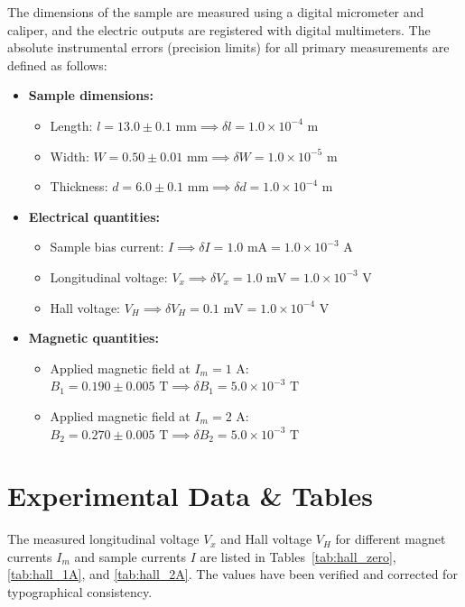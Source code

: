 \documentclass[a4paper,11pt]{article}
\begin{document}
The dimensions of the sample are measured using a digital micrometer and caliper, and the electric outputs are registered with digital multimeters. The absolute instrumental errors (precision limits) for all primary measurements are defined as follows:
\begin{itemize}
    \item {\bf Sample dimensions:}
    \begin{itemize}
        \item Length: $l = 13.0 \pm 0.1\text{ mm} \implies \delta l = 1.0 \times 10^{-4}\text{ m}$
        \item Width: $W = 0.50 \pm 0.01\text{ mm} \implies \delta W = 1.0 \times 10^{-5}\text{ m}$
        \item Thickness: $d = 6.0 \pm 0.1\text{ mm} \implies \delta d = 1.0 \times 10^{-4}\text{ m}$
    \end{itemize}
    \item {\bf Electrical quantities:}
    \begin{itemize}
        \item Sample bias current: $I \implies \delta I = 1.0\text{ mA} = 1.0 \times 10^{-3}\text{ A}$
        \item Longitudinal voltage: $V_x \implies \delta V_x = 1.0\text{ mV} = 1.0 \times 10^{-3}\text{ V}$
        \item Hall voltage: $V_H \implies \delta V_H = 0.1\text{ mV} = 1.0 \times 10^{-4}\text{ V}$
    \end{itemize}
    \item {\bf Magnetic quantities:}
    \begin{itemize}
        \item Applied magnetic field at $I_m = 1\text{ A}$: $B_1 = 0.190 \pm 0.005\text{ T} \implies \delta B_1 = 5.0 \times 10^{-3}\text{ T}$
        \item Applied magnetic field at $I_m = 2\text{ A}$: $B_2 = 0.270 \pm 0.005\text{ T} \implies \delta B_2 = 5.0 \times 10^{-3}\text{ T}$
    \end{itemize}
\end{itemize}

\section{Experimental Data \& Tables}
The measured longitudinal voltage $V_x$ and Hall voltage $V_H$ for different magnet currents $I_m$ and sample currents $I$ are listed in Tables~\ref{tab:hall_zero}, \ref{tab:hall_1A}, and \ref{tab:hall_2A}. The values have been verified and corrected for typographical consistency.
\end{document}
